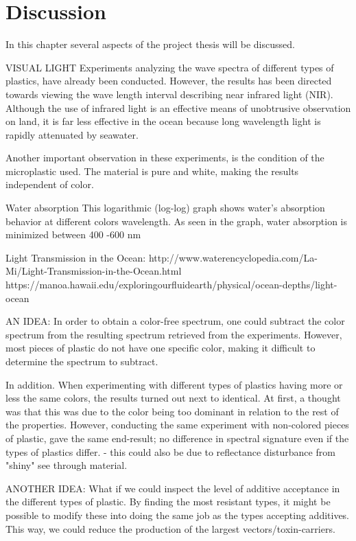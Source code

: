 \chapter{Discussion}
\label{chap:discussion}
 In this chapter several aspects of the project thesis will be discussed.
 

VISUAL LIGHT
Experiments analyzing the wave spectra of different types of plastics, have already been conducted. However, the results has been directed towards viewing the wave length interval describing near infrared light (NIR). Although the use of infrared light is an effective means of unobtrusive observation on land, it is far less effective in the ocean because long wavelength light is rapidly attenuated by seawater.

Another important observation in these experiments, is the condition of the microplastic used. The material is pure and white, making the results independent of color. 

Water absorption 
This logarithmic (log-log) graph shows water’s absorption behavior at different colors wavelength. As seen in the graph, water absorption is minimized between 400 -600 nm


Light Transmission in the Ocean: http://www.waterencyclopedia.com/La-Mi/Light-Transmission-in-the-Ocean.html
https://manoa.hawaii.edu/exploringourfluidearth/physical/ocean-depths/light-ocean


AN IDEA:
In order to obtain a color-free spectrum, one could subtract the color spectrum from the resulting spectrum retrieved from the experiments. However, most pieces of plastic do not have one specific color, making it difficult to determine the spectrum to subtract. 

In addition. When experimenting with different types of plastics having more or less the same colors, the results turned out next to identical. At first, a thought was that this was due to the color being too dominant in relation to the rest of the properties. However, conducting the same experiment with non-colored pieces of plastic, gave the same end-result; no difference in spectral signature even if the types of plastics differ. - this could also be due to reflectance disturbance from "shiny" see through material. 

ANOTHER IDEA: 
What if we could inspect the level of additive acceptance in the different types of plastic. By finding the most resistant types, it might be possible to modify these into doing the same job as the types accepting additives. This way, we could reduce the production of the largest vectors/toxin-carriers. 